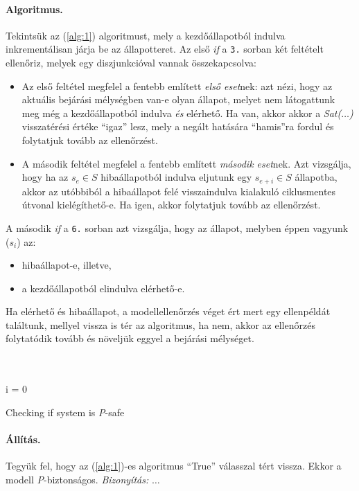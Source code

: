 \paragraph{Algoritmus.}
Tekintsük az (\ref{alg:1}) algoritmust, mely a kezdőállapotból indulva inkrementálisan járja be az állapotteret. Az első \emph{if} a \verb+3.+ sorban két feltételt ellenőriz, melyek egy diszjunkcióval vannak összekapcsolva:
\begin{itemize}
	\item Az első feltétel megfelel a fentebb említett \emph{első eset}nek: azt nézi, hogy az aktuális bejárási mélységben van-e olyan állapot, melyet nem látogattunk meg még a kezdőállapotból indulva \emph{és} elérhető. Ha van, akkor akkor a \emph{Sat($\ldots$)} visszatérési értéke ``igaz'' lesz, mely a negált hatására ``hamis''ra fordul és folytatjuk tovább az ellenőrzést.
	
	\item A második feltétel megfelel a fentebb említett \emph{második eset}nek. Azt vizsgálja, hogy ha az $s_e \in S$ hibaállapotból indulva eljutunk egy $s_{e+i} \in S$ állapotba, akkor az utóbbiból a hibaállapot felé visszaindulva kialakuló ciklusmentes útvonal kielégíthető-e. Ha igen, akkor folytatjuk tovább az ellenőrzést.
\end{itemize}
A második \emph{if} a \verb+6.+ sorban azt vizsgálja, hogy az állapot, melyben éppen vagyunk ($s_i$) az:
\begin{itemize}
	\item hibaállapot-e, illetve,
	\item a kezdőállapotból elindulva elérhető-e.
\end{itemize}
Ha elérhető és hibaállapot, a modellellenőrzés véget ért mert egy ellenpéldát találtunk, mellyel vissza is tér az algoritmus, ha nem, akkor az ellenőrzés folytatódik tovább és növeljük eggyel a bejárási mélységet.
\ \\
\ \\
\ \\
\begin{algorithm}[H]
\label{alg:1}

\SetAlgoLined
i = 0 \\
\caption{Checking if system is \emph{P}-safe}
\end{algorithm}

\paragraph{Állítás.} Tegyük fel, hogy az (\ref{alg:1})-es algoritmus ``True'' válasszal tért vissza. Ekkor a modell \emph{P}-biztonságos.
\newline
\newline
\emph{Bizonyítás:} $\ldots$

